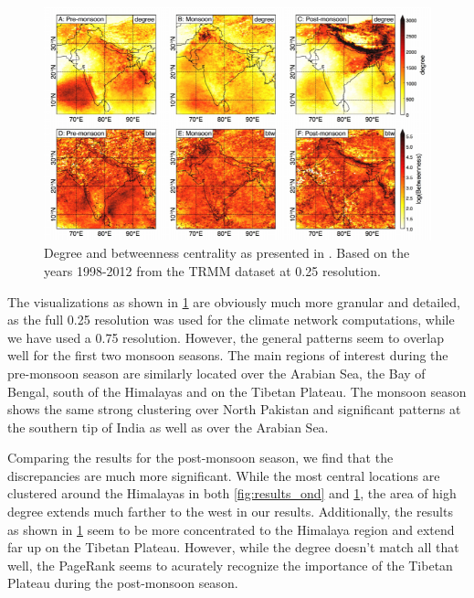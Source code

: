 \begin{figure}[H]
  \centering
  \includegraphics[width=\textwidth]{./99_appendix/img/results_stolbova.png}
  \caption{Degree and betweenness centrality as presented in \citet{Stolbova.2015}. Based on the years 1998-2012 from the TRMM dataset at {0.25\degree} resolution.}
  \label{fig:results_stolbova}
\end{figure}

The visualizations as shown in \cref{fig:results_stolbova} are obviously much more granular and detailed, as the full {0.25\degree} resolution was used for the climate network computations, while we have used a {0.75\degree} resolution. However, the general patterns seem to overlap well for the first two monsoon seasons. The main regions of interest during the pre-monsoon season are similarly located over the Arabian Sea, the Bay of Bengal, south of the Himalayas and on the Tibetan Plateau. The monsoon season shows the same strong clustering over North Pakistan and significant patterns at the southern tip of India as well as over the Arabian Sea.

Comparing the results for the post-monsoon season, we find that the discrepancies are much more significant. While the most central locations are clustered around the Himalayas in both \cref{fig:results_ond} and \cref{fig:results_stolbova}, the area of high degree extends much farther to the west in our results. Additionally, the results as shown in \cref{fig:results_stolbova} seem to be more concentrated to the Himalaya region and extend far up on the Tibetan Plateau. However, while the degree doesn't match all that well, the PageRank seems to acurately recognize the importance of the Tibetan Plateau during the post-monsoon season.

